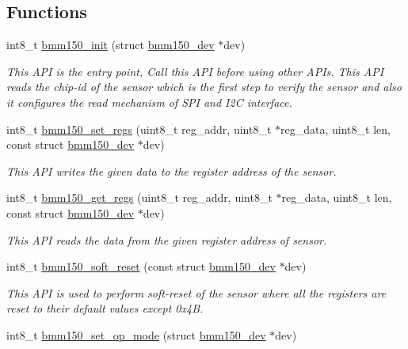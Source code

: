 \subsection*{Functions}
\begin{DoxyCompactItemize}
\item 
int8\+\_\+t \hyperlink{group___b_m_m150_gab4897d93fb8406c61d6bfab44de8c054}{bmm150\+\_\+init} (struct \hyperlink{structbmm150__dev}{bmm150\+\_\+dev} $\ast$dev)
\begin{DoxyCompactList}\small\item\em This A\+PI is the entry point, Call this A\+PI before using other A\+P\+Is. This A\+PI reads the chip-\/id of the sensor which is the first step to verify the sensor and also it configures the read mechanism of S\+PI and I2C interface. \end{DoxyCompactList}\item 
int8\+\_\+t \hyperlink{group___b_m_m150_ga88285b4abe005f21a5cc9392dddb9de9}{bmm150\+\_\+set\+\_\+regs} (uint8\+\_\+t reg\+\_\+addr, uint8\+\_\+t $\ast$reg\+\_\+data, uint8\+\_\+t len, const struct \hyperlink{structbmm150__dev}{bmm150\+\_\+dev} $\ast$dev)
\begin{DoxyCompactList}\small\item\em This A\+PI writes the given data to the register address of the sensor. \end{DoxyCompactList}\item 
int8\+\_\+t \hyperlink{group___b_m_m150_gac3b65c846fa1d826b2addbbef4292a9c}{bmm150\+\_\+get\+\_\+regs} (uint8\+\_\+t reg\+\_\+addr, uint8\+\_\+t $\ast$reg\+\_\+data, uint8\+\_\+t len, const struct \hyperlink{structbmm150__dev}{bmm150\+\_\+dev} $\ast$dev)
\begin{DoxyCompactList}\small\item\em This A\+PI reads the data from the given register address of sensor. \end{DoxyCompactList}\item 
int8\+\_\+t \hyperlink{group___b_m_m150_gad53c0f1cab22067aaff73d0f172a9dbe}{bmm150\+\_\+soft\+\_\+reset} (const struct \hyperlink{structbmm150__dev}{bmm150\+\_\+dev} $\ast$dev)
\begin{DoxyCompactList}\small\item\em This A\+PI is used to perform soft-\/reset of the sensor where all the registers are reset to their default values except 0x4B. \end{DoxyCompactList}\item 
int8\+\_\+t \hyperlink{group___b_m_m150_ga6b8ebfb4d731d5880ef87ecffc72a43b}{bmm150\+\_\+set\+\_\+op\+\_\+mode} (struct \hyperlink{structbmm150__dev}{bmm150\+\_\+dev} $\ast$dev)

\end{DoxyCompactItemize}
